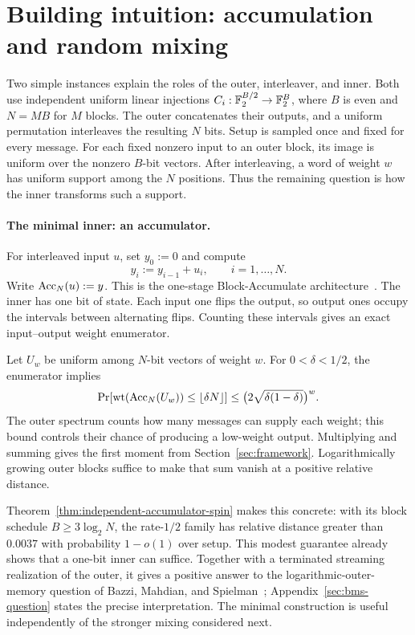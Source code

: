 \section{Building intuition: accumulation and random mixing}
\label{sec:spin-intuition}

Two simple instances explain the roles of the outer, interleaver, and inner.
Both use independent uniform linear injections
$C_i:\mathbb F_2^{B/2}\to\mathbb F_2^B$, where $B$ is even and $N=MB$ for $M$ blocks.
The outer concatenates their outputs, and a uniform permutation interleaves
the resulting $N$ bits. Setup is sampled once and fixed for every message.
For each fixed nonzero input to an outer block, its image is uniform over
the nonzero $B$-bit vectors. After interleaving, a word of weight $w$ has
uniform support among the $N$ positions. Thus the remaining question is
how the inner transforms such a support.

\paragraph{The minimal inner: an accumulator.}
For interleaved input $u$, set $y_0:=0$ and compute
\[
  y_i:=y_{i-1}+u_i,\qquad i=1,\ldots,N.
\]
Write $\operatorname{Acc}_N(u):=y$. This is the one-stage Block-Accumulate
architecture~\cite{KolesnikovEtAl2026BA}.
The inner has one bit of state. Each input one flips the output, so output
ones occupy the intervals between alternating flips. Counting these
intervals gives an exact input--output weight enumerator.

Let $U_w$ be uniform among $N$-bit vectors of weight $w$.
For $0<\delta<1/2$, the enumerator implies
\[
 \Pr[\operatorname{wt}(\operatorname{Acc}_N(U_w))\le\lfloor\delta N\rfloor]
 \le \bigl(2\sqrt{\delta(1-\delta)}\bigr)^w.
\]
The outer spectrum counts how many messages can supply each weight;
this bound controls their chance of producing a low-weight output.
Multiplying and summing gives the first moment from
Section~\ref{sec:framework}. Logarithmically growing outer blocks suffice
to make that sum vanish at a positive relative distance.

Theorem~\ref{thm:independent-accumulator-spin} makes this concrete:
with its block schedule $B\ge3\log_2N$, the rate-$1/2$ family has relative
distance greater than $0.0037$ with probability $1-o(1)$ over setup.
This modest guarantee already shows that a one-bit inner can suffice.
Together with a terminated streaming realization of the outer, it gives
a positive answer to the logarithmic-outer-memory question of
Bazzi, Mahdian, and Spielman~\cite{bms09}; Appendix~\ref{sec:bms-question}
states the precise interpretation. The minimal construction is useful
independently of the stronger mixing considered next.

